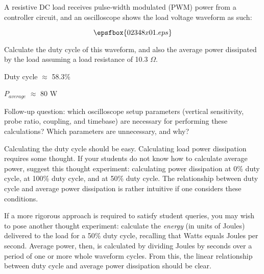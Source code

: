 

A resistive DC load receives pulse-width modulated (PWM) power from a controller circuit, and an oscilloscope shows the load voltage waveform as such:

$$\epsfbox{02348x01.eps}$$

Calculate the duty cycle of this waveform, and also the average power dissipated by the load assuming a load resistance of 10.3 $\Omega$.







Duty cycle $\approx$ 58.3\%

$P_{average}$ $\approx$ 80 W

\vskip 10pt

Follow-up question: which oscilloscope setup parameters (vertical sensitivity, probe ratio, coupling, and timebase) are necessary for performing these calculations?  Which parameters are unnecessary, and why?







Calculating the duty cycle should be easy.  Calculating load power dissipation requires some thought.  If your students do not know how to calculate average power, suggest this thought experiment: calculating power dissipation at 0\% duty cycle, at 100\% duty cycle, and at 50\% duty cycle.  The relationship between duty cycle and average power dissipation is rather intuitive if one considers these conditions.

If a more rigorous approach is required to satisfy student queries, you may wish to pose another thought experiment: calculate the {\it energy} (in units of Joules) delivered to the load for a 50\% duty cycle, recalling that Watts equals Joules per second.  Average power, then, is calculated by dividing Joules by seconds over a period of one or more whole waveform cycles.  From this, the linear relationship between duty cycle and average power dissipation should be clear.




